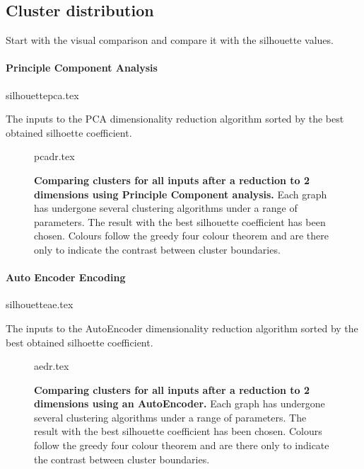 \subsection{Cluster distribution}\label{sec:cldist}

Start with the visual comparison and compare it with the silhouette values. 




\paragraph*{Principle Component Analysis}


\begin{table}[H]
    \centering
        {silhouettepca.tex}
        \caption{The inputs to the PCA dimensionality reduction algorithm sorted by the best obtained silhoette coefficient.  }
        \label{tab:pcasil}
\end{table}



\begin{landscape}
\begin{figure}[H]
    {pcadr.tex}
    \caption{\textbf{Comparing clusters for all inputs after a reduction to 2 dimensions using Principle Component analysis.}
    Each graph has undergone several clustering algorithms under a range of parameters. The result with the best silhouette coefficient has been chosen. Colours follow the greedy four colour theorem and are there only to indicate the contrast between cluster boundaries.}
    \label{fig:pcavis}
\end{figure}
\end{landscape}






\paragraph*{Auto Encoder Encoding}

\begin{table}[H]
    \centering
        {silhouetteae.tex}
        \caption{The inputs to the AutoEncoder dimensionality reduction algorithm sorted by the best obtained silhoette coefficient.  }
        \label{tab:aesil}
\end{table}





\begin{landscape}
\begin{figure}[H]
    {aedr.tex}
    \caption{\textbf{Comparing clusters for all inputs after a reduction to 2 dimensions using an AutoEncoder.}
    Each graph has undergone several clustering algorithms under a range of parameters. The result with the best silhouette coefficient has been chosen. Colours follow the greedy four colour theorem and are there only to indicate the contrast between cluster boundaries.}
    \label{fig:aevis}
\end{figure}
\end{landscape}




